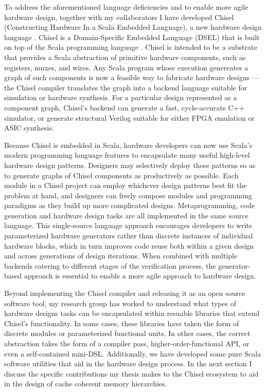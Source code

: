 To address the aforementioned language deficiencies and to enable more agile hardware design, together with my collaborators I have developed Chisel (Constructing Hardware In a Scala Embedded Language), a new hardware design language \cite{chisel}.
Chisel is a Domain-Specific Embedded Language (DSEL) that is built on top of the Scala programming language \cite{scala}.
Chisel is intended to be a substrate that provides a Scala abstraction of primitive hardware components, such as registers, muxes, and wires.
Any Scala program whose execution genereates a graph of such components is now a feasible way to fabricate hardware designs --- the Chisel compiler translates the graph into a backend language suitable for simulation or hardware synthesis.
For a particular design represented as a component graph, Chisel's backend can generate a fast, cycle-accurate C++ simulator, or generate structural Verilog suitable for either FPGA emulation or ASIC synthesis.

Because Chisel is embedded in Scala, hardware developers can now use Scala's modern programming language features to encapsulate many useful high-level hardware design patterns.
Designers may selectively deploy these patterns so as to generate graphs of Chisel components as productively as possible.
Each module in a Chisel project can employ whichever design patterns best fit the problem at hand, and designers can freely compose modules and programming paradigms as they build up more complicated designs.
Metaprogramming, code generation and hardware design tasks are all implemented in the same source language.
This single-source language approach encourages developers to write parameterized hardware generators rather than discrete instances of individual hardware blocks,
which in turn improves code reuse both within a given design and across generations of design iterations.
When combined with multiple backends catering to different stages of the verification process, the generator-based approach is essential to enable a more agile approach to hardware design.

Beyond implementing the Chisel compiler and releasing it as an open source software tool, my research group has worked to understand what types of hardware designs tasks can be encapsulated within resuable libraries that extend Chisel's functionality.
In some cases, these libraries have taken the form of discrete modules or parameterized functional units.
In other cases, the correct abstraction takes the form of a compiler pass, higher-order-functional API, or even a self-contained mini-DSL.
Additionally, we have developed some pure Scala software utilities that aid in the hardware design process.
In the next section I discuss the specific contributions my thesis makes to the Chisel ecosystem to aid in the design of cache coherent memory hierarchies.

